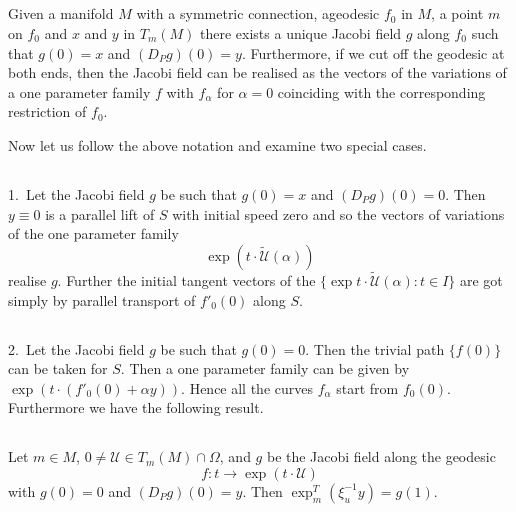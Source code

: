 \setcounter{subsection}{25}

\subsection{}\label{chap2:2.8.26}

\begin{prop*}
Given a manifold $M$ with a symmetric connection, a\break geodesic $f_{0}$
in $M$, a point $m$ on $f_{0}$ and $x$ and $y$ in $T_{m}(M)$ there
exists a unique Jacobi field $g$ along $f_{0}$ such that
$g(0)=x$ \pageoriginale and $(D_{P}g)(0)=y$. Furthermore, if we cut off
the geodesic at both ends, then the Jacobi field can be realised as
the vectors of the variations of a one parameter family $f$ with
$f_{\alpha}$ for $\alpha=0$ coinciding with the corresponding
restriction of $f_{0}$.
\end{prop*}

Now let us follow the above notation and examine two special cases.

\setcounter{subsection}{26}
\subsection{}\label{chap2:2.8.27}
1.~Let the Jacobi field $g$ be such that $g(0)=x$ and
$(D_{P}g)(0)=0$. Then $y\equiv 0$ is a parallel lift of $S$ with
initial speed zero and so the vectors of variations of the one
parameter family
$$
\exp(t\cdot \widetilde{\mathscr{U}}(\alpha))
$$
realise $g$. Further the initial tangent vectors of the $\{\exp
t\cdot\widetilde{\mathscr{U}}(\alpha):t\in I\}$ are got simply by
parallel transport of $f'_{0}(0)$ along $S$.

\subsection{}\label{chap2:2.8.28}
2.~Let the Jacobi field $g$ be such that $g(0)=0$. Then the trivial
path $\{f(0)\}$ can be taken for $S$. Then a one parameter family can
be given by $\exp(t\cdot (f'_{0}(0)+\alpha y))$. Hence all the curves
$f_{\alpha}$ start from $f_{0}(0)$. Furthermore we have the following
result.

\subsection{}\label{chap2:2.8.29}

\begin{coro*}
Let $m\in M$, $0\neq \mathscr{U}\in T_{m}(M)\cap \Omega$, and $g$ be
the Jacobi field along the geodesic
$$
f:t\to \exp (t\cdot \mathscr{U})
$$
with $g(0)=0$ and $(D_{P}g)(0)=y$. Then
$\exp^{T}_{m}(\xi^{-1}_{u}y)=g(1)$. 
\end{coro*}

